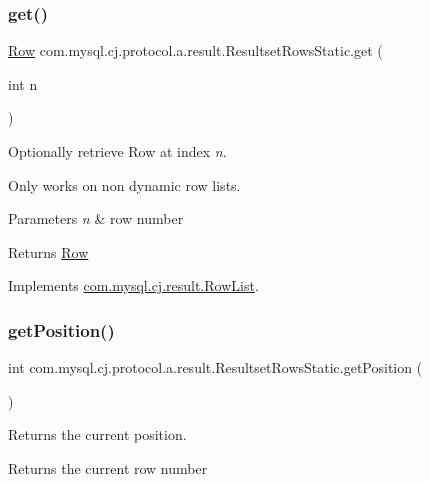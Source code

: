 \subsubsection{\texorpdfstring{get()}{get()}}
{\footnotesize\ttfamily \mbox{\hyperlink{interfacecom_1_1mysql_1_1cj_1_1result_1_1_row}{Row}} com.\+mysql.\+cj.\+protocol.\+a.\+result.\+Resultset\+Rows\+Static.\+get (\begin{DoxyParamCaption}\item[{int}]{n }\end{DoxyParamCaption})}

Optionally retrieve Row at index {\itshape n}.

Only works on non dynamic row lists.


\begin{DoxyParams}{Parameters}
{\em n} & row number \\
\hline
\end{DoxyParams}
\begin{DoxyReturn}{Returns}
\mbox{\hyperlink{}{Row}} 
\end{DoxyReturn}


Implements \mbox{\hyperlink{interfacecom_1_1mysql_1_1cj_1_1result_1_1_row_list_ac5f33b198acdb87ba7ab84da6cddef93}{com.\+mysql.\+cj.\+result.\+Row\+List}}.

\mbox{\label{classcom_1_1mysql_1_1cj_1_1protocol_1_1a_1_1result_1_1_resultset_rows_static_a3177c1c1350ee04c5d9ab5130e40e97f}} 
\subsubsection{\texorpdfstring{get\+Position()}{getPosition()}}
{\footnotesize\ttfamily int com.\+mysql.\+cj.\+protocol.\+a.\+result.\+Resultset\+Rows\+Static.\+get\+Position (\begin{DoxyParamCaption}{ }\end{DoxyParamCaption})}

Returns the current position.

\begin{DoxyReturn}{Returns}
the current row number 
\end{DoxyReturn}


